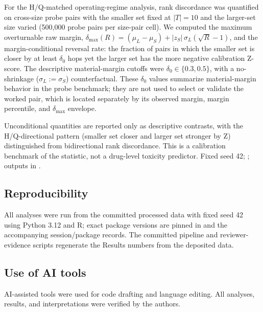 For the H/Q-matched operating-regime analysis, rank discordance was quantified on cross-size probe pairs with the smaller set fixed at $|T|=10$ and the larger-set size varied (500{,}000 probe pairs per size-pair cell). We computed the maximum overturnable raw margin, $\delta_{\max}(R)=(\mu_L-\mu_S)+|z_S|\,\sigma_L(\sqrt{R}-1)$, and the margin-conditional reversal rate: the fraction of pairs in which the smaller set is closer by at least $\delta_0$ hops yet the larger set has the more negative calibration Z-score. The descriptive material-margin cutoffs were $\delta_0\in\{0.3,0.5\}$, with a no-shrinkage ($\sigma_L:=\sigma_S$) counterfactual. These $\delta_0$ values summarize material-margin behavior in the probe benchmark; they are not used to select or validate the worked pair, which is located separately by its observed margin, margin percentile, and $\delta_{\max}$ envelope.

Unconditional quantities are reported only as descriptive contrasts, with the H/Q-directional pattern (smaller set closer and larger set stronger by Z) distinguished from bidirectional rank discordance. This is a calibration benchmark of the statistic, not a drug-level toxicity predictor. Fixed seed 42; ; outputs in .

\subsection{Reproducibility}
All analyses were run from the committed processed data with fixed seed 42 using Python 3.12 and R; exact package versions are pinned in  and the accompanying session/package records. The committed pipeline and reviewer-evidence scripts regenerate the Results numbers from the deposited data.

\subsection*{Use of AI tools}
AI-assisted tools were used for code drafting and language editing. All analyses, results, and interpretations were verified by the authors.
